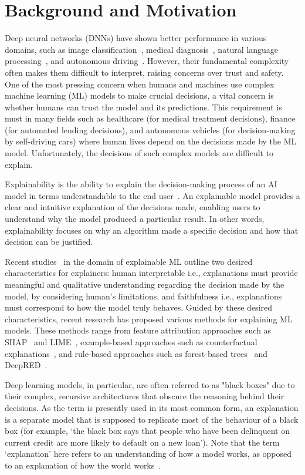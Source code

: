 \section{Background and Motivation}
Deep neural networks (DNNs) have shown better performance in various domains, such as  image classification~\autocite{s22239544}, medical diagnosis~\autocite{SHAMSHIRBAND2021103627}, natural language processing~\autocite{Wang23}, and autonomous driving~\autocite{s19092064}. However, their fundamental complexity often makes them difficult to interpret, raising concerns over trust and safety. One of the most pressing concern when humans and machines use complex machine learning (ML) models to make crucial decisions, a vital concern is whether humans can trust the model and its predictions. This requirement is must in many fields such as healthcare (for medical treatment decisions), finance (for automated lending decisions), and autonomous vehicles (for decision-making by self-driving cars) where human lives depend on the decisions made by the ML model. Unfortunately, the decisions of such complex models are difficult to explain.

Explainability is the ability to explain the decision-making process of an AI model in terms understandable to the end user~\cite{8631448}. An explainable model provides a clear and intuitive explanation of the decisions made, enabling users to understand why the model produced a particular result. In other words, explainability focuses on why an algorithm made a specific decision and how that decision can be justified.

Recent studies~\cite{Ribeiro2018,chan2022comparativestudyfaithfulnessmetrics,Singh1622975}
 in the domain of explainable ML outline two desired characteristics for explainers: human interpretable i.e., explanations must provide meaningful and qualitative understanding regarding the decision made by the model, by considering human’s limitations, and faithfulness i.e., explanations must correspond to how the model truly behaves. Guided by these desired characteristics, recent research has proposed various methods for explaining ML models. These methods range from feature attribution approaches such as SHAP~\cite{lundberg2017unifiedapproachinterpretingmodel} and LIME~\cite{Ribeiro2018}, example-based approaches such as counterfactual explanations~\cite{wachter2018CE}, and rule-based approaches such as forest-based trees~\cite{SAGI2020124} and DeepRED~\cite{wachter2018CE}.

Deep learning models, in particular, are often referred to as "black boxes" due to their complex, recursive architectures that obscure the reasoning behind their decisions. As the term is presently used in its most common form, an explanation is a separate model that is supposed to replicate most of the behaviour of a black box (for example, ‘the black box says that people who have been delinquent on current credit are more likely to default on a new loan’). Note that the term ‘explanation’ here refers to an understanding of how a model works, as opposed to an explanation of how the world works~\cite{Rudin2019}.

